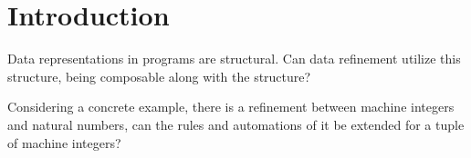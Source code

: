 \section{Introduction}

Data representations in programs are structural. Can data refinement utilize this structure, being composable along with the structure?

Considering a concrete example, there is a refinement between machine integers and natural numbers, can the rules and automations of it be extended for a tuple of machine integers?

